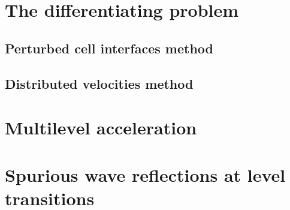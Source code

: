 \section{The differentiating problem}

\subsection{Perturbed cell interfaces method}

\subsection{Distributed velocities method}

\section{Multilevel acceleration}

\section{Spurious wave reflections at level transitions}
